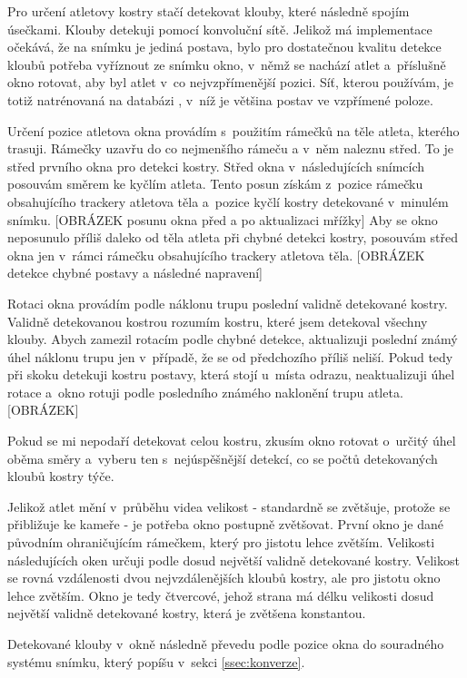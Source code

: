 Pro určení atletovy kostry stačí detekovat klouby, které následně spojím úsečkami. Klouby detekuji pomocí konvoluční sítě. Jelikož má implementace očekává, že na snímku je jediná postava, bylo pro dostatečnou kvalitu detekce kloubů potřeba vyříznout ze snímku okno, v~němž se nachází atlet a~příslušně okno rotovat, aby byl atlet v~co nejvzpřímenější pozici. Síť, kterou používám, je totiž natrénovaná na databázi \citep{MPIIHPE}, v~níž je většina postav ve vzpřímené poloze.

Určení pozice atletova okna provádím s~použitím rámečků na těle atleta, kterého trasuji. Rámečky uzavřu do co nejmenšího rámeču a v~něm naleznu střed. To je střed prvního okna pro detekci kostry. Střed okna v~následujících snímcích posouvám směrem ke kyčlím atleta. Tento posun získám z~pozice rámečku obsahujícího trackery atletova těla a~pozice kyčlí kostry detekované v~minulém snímku. [OBRÁZEK posunu okna před a po aktualizaci mřížky] Aby se okno neposunulo příliš daleko od těla atleta při chybné detekci kostry, posouvám střed okna jen v~rámci rámečku obsahujícího trackery atletova těla. [OBRÁZEK detekce chybné postavy a následné napravení]

Rotaci okna provádím podle náklonu trupu poslední validně detekované kostry. Validně detekovanou kostrou rozumím kostru, které jsem detekoval všechny klouby. Abych zamezil rotacím podle chybné detekce, aktualizuji poslední známý úhel náklonu trupu jen v~případě, že se od předchozího příliš neliší. Pokud tedy při skoku detekuji kostru postavy, která stojí u~místa odrazu, neaktualizuji úhel rotace a~okno rotuji podle posledního známého naklonění trupu atleta. [OBRÁZEK]

Pokud se mi nepodaří detekovat celou kostru, zkusím okno rotovat o~určitý úhel oběma směry a~vyberu ten s~nejúspěšnější detekcí, co se počtů detekovaných kloubů kostry týče.

Jelikož atlet mění v~průběhu videa velikost - standardně se zvětšuje, protože se přibližuje ke kameře - je potřeba okno postupně zvětšovat. První okno je dané původním ohraničujícím rámečkem, který pro jistotu lehce zvětším. Velikosti následujících oken určuji podle dosud největší validně detekované kostry. Velikost se rovná vzdálenosti dvou nejvzdálenějších kloubů kostry, ale pro jistotu okno lehce zvětším. Okno je tedy čtvercové, jehož strana má délku velikosti dosud největší validně detekované kostry, která je zvětšena konstantou.

Detekované klouby v~okně následně převedu podle pozice okna do souradného systému snímku, který popíšu v~sekci \ref{ssec:konverze}.

